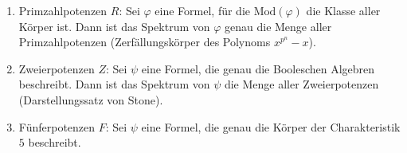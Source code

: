 \begin{solution}
\phantom{}

	\begin{enumerate}[label = \arabic*.]
		\item Primzahlpotenzen $R$: Sei $\varphi$ eine Formel, für die $\mathrm{Mod}(\varphi)$ die Klasse aller Körper ist.
		Dann ist das Spektrum von $\varphi$ genau die Menge aller Primzahlpotenzen (Zerfällungskörper des Polynoms $x^{p^n}- x$).

		\item Zweierpotenzen $Z$: Sei $\psi$ eine Formel, die genau die Booleschen Algebren beschreibt. Dann ist das Spektrum von $\psi$ die Menge aller Zweierpotenzen (Darstellungssatz von Stone).

		\item Fünferpotenzen $F$: Sei $\psi$ eine Formel, die genau die Körper der
		Charakteristik $5$ beschreibt.


\end{enumerate}
\end{solution}
